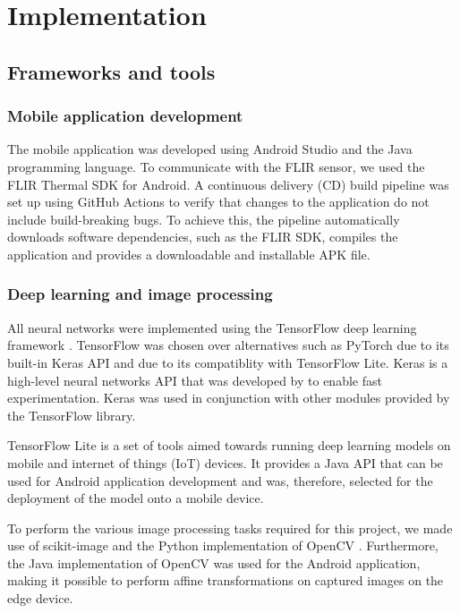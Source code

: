 \documentclass{l4proj}
\begin{document}
\chapter{Implementation}
\label{implementation}

\section{Frameworks and tools}

\subsection{Mobile application development}

The mobile application was developed using Android Studio and the Java programming language. To communicate with the FLIR sensor, we used the FLIR Thermal SDK for Android. A continuous delivery (CD) build pipeline was set up using GitHub Actions to verify that changes to the application do not include build-breaking bugs. To achieve this, the pipeline automatically downloads software dependencies, such as the FLIR SDK, compiles the application and provides a downloadable and installable APK file.

\subsection{Deep learning and image processing}

All neural networks were implemented using the TensorFlow deep learning framework \citep{abadi_TensorFlow_2016}. TensorFlow was chosen over alternatives such as PyTorch due to its built-in Keras API and due to its compatiblity with TensorFlow Lite. Keras is a high-level neural networks API that was developed by \citet{chollet_keras_2015} to enable fast experimentation. Keras was used in conjunction with other modules provided by the TensorFlow library. 

TensorFlow Lite is a set of tools aimed towards running deep learning models on mobile and internet of things (IoT) devices. It provides a Java API that can be used for Android application development and was, therefore, selected for the deployment of the model onto a mobile device.

To perform the various image processing tasks required for this project, we made use of scikit-image \citep{van_der_walt_scikit-image_2014} and the Python implementation of OpenCV \citep{bradski_opencv_2000}. Furthermore, the Java implementation of OpenCV was used for the Android application, making it possible to perform affine transformations on captured images on the edge device.
\end{document}
